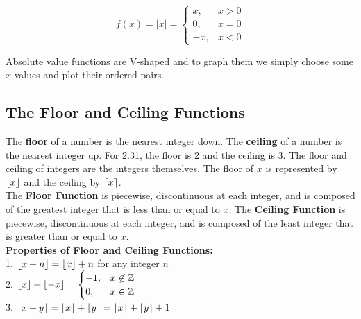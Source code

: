 \documentclass{article}
\DeclarePairedDelimiter\ceil{\lceil}{\rceil}
\DeclarePairedDelimiter\floor{\lfloor}{\rfloor}
\begin{document}
    \begin{equation*}
        f(x)=|x|=
        \begin{cases}
            x, & x>0 \\
            0, & x=0 \\
            -x, & x<0
        \end{cases}
    \end{equation*}

    \noindent Absolute value functions are V-shaped and to graph them we simply choose some
    $x$-values and plot their ordered pairs. \\

    \begin{center}
    \end{center}

    \subsection{The Floor and Ceiling Functions}

    The \textbf{floor} of a number is the nearest integer down. The \textbf{ceiling} of a number
    is the nearest integer up. For 2.31, the floor is 2 and the ceiling is 3. The floor and
    ceiling of integers are the integers themselves. The floor of $x$ is represented by
    $\floor*{x}$ and the ceiling by $\ceil*{x}$. \\

    \noindent The \textbf{Floor Function} is piecewise, discontinuous at each integer, and is
    composed of the greatest integer that is less than or equal to $x$. The
    \textbf{Ceiling Function} is piecewise, discontinuous at each integer, and is composed of
    the least integer that is greater than or equal to $x$.\\

    \noindent \color{purple} \textbf{Properties of Floor and Ceiling Functions:} \color{black} \\
    1. $\floor*{x+n}=\floor*{x}+n$ for any integer $n$ \\
    2. $\floor*{x}+\floor*{-x}=\begin{cases}
                                   -1, & x \not\in \mathbb{Z}\\0, &x\in\mathbb{Z}
    \end{cases}$ \\
    3. $\floor*{x+y}=\floor*{x}+\floor*{y}=\floor*{x}+\floor*{y}+1$ \\
\end{document}
